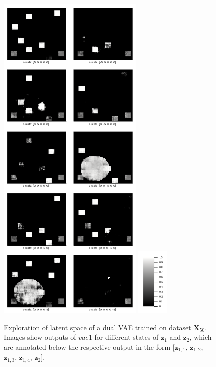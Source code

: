 \documentclass[12pt]{report}
\theoremstyle{definition}
\begin{document}
\begin{figure}
\begin{center}
  \includegraphics[width=7cm]{../code/plots/exploration2.png}
  \includegraphics[width=1.5cm]{../code/plots/scale.png}
  \caption{Exploration of latent space of a dual VAE trained on dataset $\mathbf{X}_{50}$. Images show outputs of $vae1$ for different states of $\mathbf{z}_1$ and $\mathbf{z}_2$, which are annotated below the respective output in the form [$\mathbf{z}_{1, 1}$, $\mathbf{z}_{1, 2}$, $\mathbf{z}_{1, 3}$, $\mathbf{z}_{1, 4}$, $\mathbf{z}_2$].}
  \label{fig:expl2}
\end{center}
\end{figure}


\newpage
\end{document}
